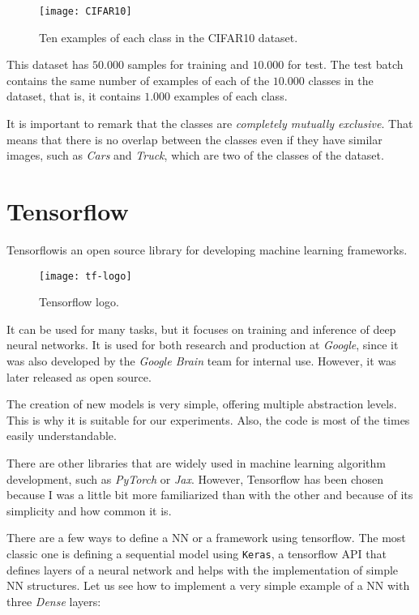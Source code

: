 \begin{figure}[H]
    \centering 
    \texttt{[image: CIFAR10]}
    \caption{Ten examples of each class in the CIFAR10 dataset. }
\end{figure}
This dataset has $50.000$ samples for training and $10.000$ for test. The test batch contains the same number of examples of each of the $10.000$ classes in the dataset, that is, it contains $1.000$ examples of each class. 

It is important to remark that the classes are \emph{completely mutually exclusive}. That means that there is no overlap between the classes even if they have similar images, such as \emph{Cars} and \emph{Truck}, which are two of the classes of the dataset.

\section{Tensorflow}



Tensorflow\footnotemark is an open source library for developing machine learning frameworks.  

\begin{wrapfigure}{r}{5cm}
    \caption{Tensorflow logo.}
    \texttt{[image: tf-logo]}
\end{wrapfigure}




It can be used for many tasks, but it focuses on training and inference of deep neural networks. It is used for both research and production at \emph{Google}, since it was also developed by the \emph{Google Brain} team for internal use. However, it was later released as open source.

The creation of new models is very simple, offering multiple abstraction levels. This is why it is suitable for our experiments. Also, the code is most of the times easily understandable.

There are other libraries that are widely used in machine learning algorithm development, such as \emph{PyTorch} or \emph{Jax}. However, Tensorflow has been chosen because I was a little bit more familiarized than with the other and because of its simplicity and how common it is. 

There are a few ways to define a NN or a framework using tensorflow. The most classic one is defining a sequential model using \lstinline{Keras}, a tensorflow API that defines layers of a neural network and helps with the implementation of simple NN structures. Let us see how to implement a very simple example of a NN with three \emph{Dense} layers: 

